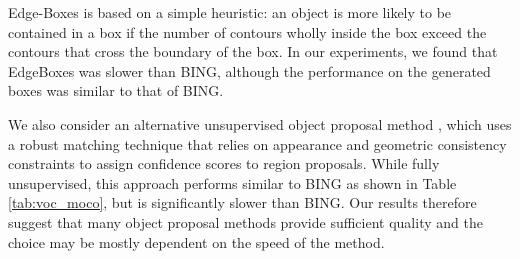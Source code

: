 Edge-Boxes \citep{Zitnick2014EdgeBL} is based on a simple heuristic: an object is more likely to be contained in a box if the number of contours wholly inside the box exceed the contours that cross the boundary of the box. In our experiments, we found that EdgeBoxes was slower than BING, although the performance on the generated boxes was similar to that of BING.

We also consider an alternative unsupervised object proposal method \citep{vo2019unsupervised}, which uses a robust matching technique that relies on appearance and geometric consistency constraints to assign confidence scores to region proposals. While fully unsupervised, this approach performs similar to BING as shown in Table \ref{tab:voc_moco}, but is significantly slower than BING. Our results therefore suggest that many object proposal methods provide sufficient quality and the choice may be mostly dependent on the speed of the method.

